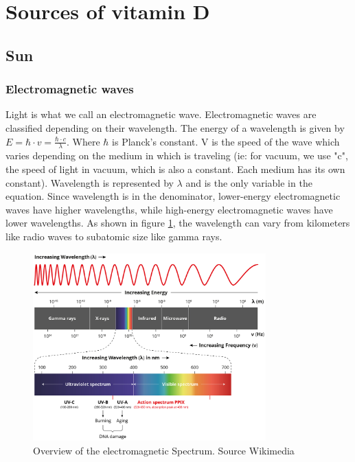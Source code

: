 \section{Sources of vitamin D}

\subsection{Sun}

\subsubsection{Electromagnetic waves}

Light is what we call an electromagnetic wave. Electromagnetic waves are classified depending on their wavelength. The energy of a wavelength is given by $E = \hbar \cdot v = \frac{\hbar \cdot c}{\lambda}$. Where $\hbar$ is Planck's constant. V is the speed of the wave which varies depending on the medium in which is traveling (ie: for vacuum, we use "c", the speed of light in vacuum, which is also a constant. Each medium has its own constant). Wavelength is represented by $\lambda$ and is the only variable in the equation. Since wavelength is in the denominator, lower-energy electromagnetic waves have higher wavelengths, while high-energy electromagnetic waves have lower wavelengths. As shown in figure \ref{fig:electroWaves}, the wavelength can vary from kilometers like radio waves to subatomic size like gamma rays.

\begin{figure}[H]
    
    \centering
    \includegraphics[width=0.8\textwidth]{figures/Vitamin D/Electromagnetic-Spectrum-FINAL.jpg}
    \caption{Overview of the electromagnetic Spectrum. Source Wikimedia}
    \label{fig:electroWaves}

\end{figure}

